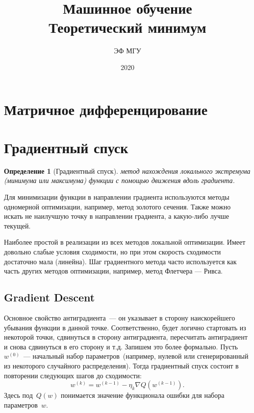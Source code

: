\documentclass[a4paper, 12pt]{article}
\title{Машинное обучение \\ Теоретический минимум}
\author{ЭФ МГУ}
\date{2020}
\theoremstyle{plain} %
\newtheorem{definition}{Определение}
\theoremstyle{definition} %
\theoremstyle{remark} %
\begin{document}
\maketitle

\section{Матричное дифференцирование}

\section{Градиентный спуск}

\begin{definition}[Градиентный спуск]
	 метод нахождения локального экстремума (минимума или максимума) функции с помощью движения вдоль градиента.
\end{definition}

Для минимизации функции в направлении градиента используются методы одномерной оптимизации, например, метод золотого сечения. Также можно искать не наилучшую точку в направлении градиента, а какую-либо лучше текущей.

Наиболее простой в реализации из всех методов локальной оптимизации. Имеет довольно слабые условия сходимости, но при этом скорость сходимости достаточно мала (линейна). Шаг градиентного метода часто используется как часть других методов оптимизации, например, метод Флетчера — Ривса.

\subsection{Gradient Descent}

Основное свойство антиградиента~--- он указывает в сторону наискорейшего убывания функции в данной точке.
Соответственно, будет логично стартовать из некоторой точки, сдвинуться в сторону антиградиента,
пересчитать антиградиент и снова сдвинуться в его сторону и т.д.
Запишем это более формально.
Пусть~$w^{(0)}$~--- начальный набор параметров~(например, нулевой или сгенерированный из некоторого
случайного распределения).
Тогда градиентный спуск состоит в повторении следующих шагов до сходимости:
\begin{equation}
\label{eq:fullgrad}
    w^{(k)}
    =
    w^{(k - 1)}
    -
    \eta_k
    \nabla Q(w^{(k - 1)}).
\end{equation}
Здесь под~$Q(w)$ понимается значение функционала ошибки для набора параметров~$w$.
\end{document}
